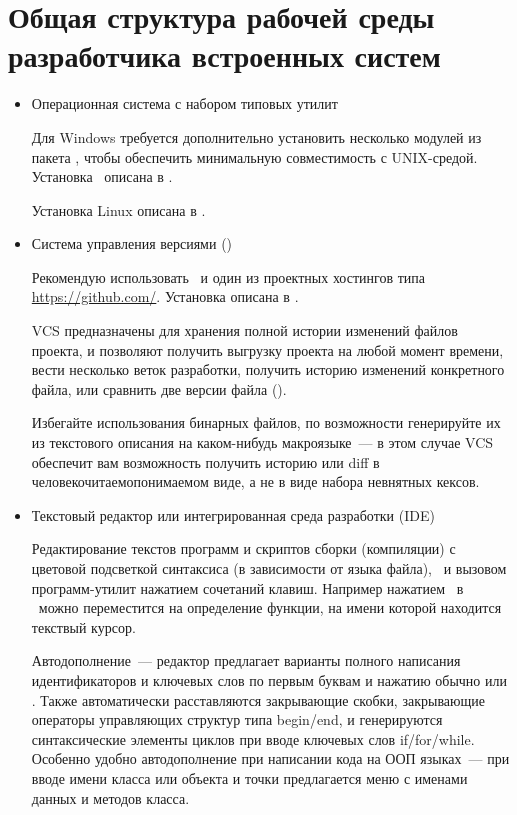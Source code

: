 

\section{Общая структура рабочей среды разработчика встроенных систем}

\begin{itemize}
  \item Операционная система с набором типовых утилит
  
  Для Windows требуется дополнительно установить несколько модулей из пакета
  , чтобы обеспечить минимальную совместимость с UNIX-средой.
  Установка \ описана в .
  
  Установка Linux описана в .
  
  \item Система управления версиями ()
  
  Рекомендую использовать \git\ и один из проектных хостингов типа
  \url{https://github.com/}. Установка описана в .
  
  VCS предназначены для хранения полной истории изменений файлов проекта, и
  позволяют получить выгрузку проекта на любой момент времени, вести несколько
  веток разработки, получить историю изменений конкретного файла, или сравнить
  две версии файла ().
  
  Избегайте использования бинарных файлов, по возможности генерируйте их из
  текстового описания на каком-нибудь макроязыке\ --- в этом случае VCS
  обеспечит вам возможность получить историю или diff в
  человекочитаемопонимаемом виде, а не в виде набора невнятных кексов.
  
  \item Текстовый редактор или интегрированная среда разработки (IDE)
  
  Редактирование текстов программ и скриптов сборки (компиляции) с
  цветовой подсветкой синтаксиса (в зависимости от языка файла),
  \ и вызовом программ-утилит нажатием сочетаний 
  клавиш. Например нажатием \ в \eclipse\ можно переместится на
  определение функции, на имени которой находится текствый курсор.
  
  Автодополнение\ --- редактор предлагает варианты полного написания
  идентификаторов и ключевых слов по первым буквам и нажатию обычно
   или . Также автоматически расставляются
  закрывающие скобки, закрывающие операторы управляющих структур типа begin/end,
  и генерируются синтаксические элементы циклов при вводе ключевых слов
  if/for/while. Особенно удобно автодополнение при написании кода на ООП 
  языках\  --- при вводе имени класса или объекта и точки предлагается меню с
  именами данных и методов класса. 
  

\end{itemize}
